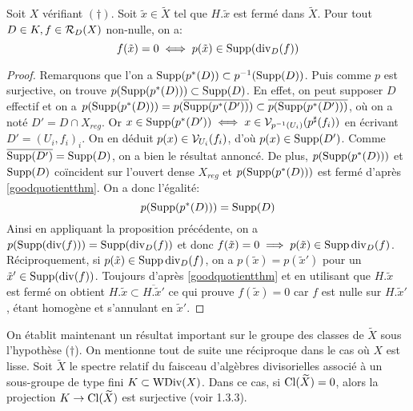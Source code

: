 \begin{cor}\label{zerosspecrelatif}
Soit $X$ vérifiant $(\dagger)$. Soit $\tilde{x}\in\widetilde{X}$ tel que $H.\tilde{x}$ est fermé dans $\widetilde{X}$. Pour tout $D\in K, f\in \mathcal{R}_D(X)$ non-nulle, on a:
$$f(\tilde{x})=0 \iff p(\tilde{x})\in \operatorname{Supp}(\operatorname{div}_D(f))$$
\end{cor}
\begin{proof}
Remarquons que l'on a $\operatorname{Supp}(p^*(D))\subset p^{-1}(\operatorname{Supp}(D))$. Puis comme $p$ est surjective, on trouve $p(\operatorname{Supp}(p^*(D)))\subset \operatorname{Supp}(D)$. En effet, on peut supposer $D$ effectif et on a $p(\operatorname{Supp}(p^*(D)))=p(\overline{\operatorname{Supp}(p^*(D'))})\subset\overline{p(\operatorname{Supp}(p^*(D')))}$, où on a noté $D'=D\cap X_{reg}$. Or $x\in \operatorname{Supp}(p^*(D'))\iff x\in \mathcal{V}_{p^{-1}(U_i)}(p^\sharp(f_i))$ en écrivant $D'=(U_i,f_i)_i$. On en déduit $p(x)\in \mathcal{V}_{U_i}(f_i)$, d'où $p(x)\in\operatorname{Supp}(D')$. Comme $\overline{\operatorname{Supp}(D')}=\operatorname{Supp}(D)$, on a bien le résultat annoncé. De plus, $p(\operatorname{Supp}(p^*(D)))$ et $\operatorname{Supp}(D)$ coïncident sur l'ouvert dense $X_{reg}$ et $p(\operatorname{Supp}(p^*(D)))$ est fermé d'après \ref{goodquotientthm}. On a donc l'égalité:$$p(\operatorname{Supp}(p^*(D)))=\operatorname{Supp}(D)$$
Ainsi en appliquant la proposition précédente, on a $p(\operatorname{Supp}(\operatorname{div}(f)))= \operatorname{Supp}(\operatorname{div}_D(f))$ et donc $f(\tilde{x})=0 \implies p(\tilde{x})\in\operatorname{Supp} \operatorname{div}_D(f)$. Réciproquement, si $p(\tilde{x})\in\operatorname{Supp} \operatorname{div}_D(f)$, on a $p(\tilde{x})=p(\tilde{x}')$ pour un $\tilde{x}'\in \operatorname{Supp}(\operatorname{div}(f))$. Toujours d'après \ref{goodquotientthm} et en utilisant que $H.\tilde{x}$ est fermé on obtient $H.\tilde{x}\subset\overline{H.\tilde{x}'}$ ce qui prouve $f(\tilde{x})=0$ car $f$ est nulle sur $H.\tilde{x}'$, étant homogène et s'annulant en $\tilde{x}'$.
\end{proof}

On établit maintenant un résultat important sur le groupe des classes de $\widetilde{X}$ sous l'hypothèse ($\dagger$). On mentionne tout de suite une réciproque dans le cas où $X$ est lisse. Soit $\widetilde{X}$ le spectre relatif du faisceau d'algèbres divisorielles associé à un sous-groupe de type fini $K\subset\operatorname{WDiv}(X)$. Dans ce cas, si $\operatorname{Cl}(\widetilde{X})=0$, alors la projection $K\rightarrow \operatorname{Cl}(\widetilde{X})$ est surjective (voir \cite{coxrings} 1.3.3).



